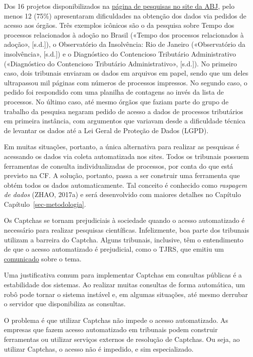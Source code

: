 \documentclass[12pt,twoside,brazilian]{book}
\begin{document}
Dos 16 projetos disponibilizados na
\href{https://abj.org.br/pesquisas/}{página de pesquisas no site da
ABJ}, pelo menos 12 (75\%) apresentaram dificuldades na obtenção dos
dados via pedidos de acesso aos órgãos. Três exemplos icônicos são o da
pesquisa sobre Tempo dos processos relacionados à adoção no Brasil
({«Tempo dos processos relacionados à adoção»}, {[}s.d.{]}), o
Observatório da Insolvência: Rio de Janeiro ({«Observatório da
insolvência»}, {[}s.d.{]}) e o Diagnóstico do Contencioso Tributário
Administrativo ({«Diagnóstico do Contencioso Tributário
Administrativo»}, {[}s.d.{]}). No primeiro caso, dois tribunais enviaram
os dados em arquivos em papel, sendo que um deles ultrapassou mil
páginas com números de processos impressos. No segundo caso, o pedido
foi respondido com uma planilha de contagens ao invés da lista de
processos. No último caso, até mesmo órgãos que faziam parte do grupo de
trabalho da pesquisa negaram pedido de acesso a dados de processos
tributários em primeira instância, com argumentos que variavam desde a
dificuldade técnica de levantar os dados até a Lei Geral de Proteção de
Dados (LGPD).

Em muitas situações, portanto, a única alternativa para realizar as
pesquisas é acessando os dados via coleta automatizada nos sites. Todos
os tribunais possuem ferramentas de consulta individualizadas de
processos, por conta do que está previsto na CF. A solução, portanto,
passa a ser construir uma ferramenta que obtém todos os dados
automaticamente. Tal conceito é conhecido como \emph{raspagem de dados}
(ZHAO, 2017a) e será desenvolvido com maiores detalhes no Capítulo
Capítulo~\ref{sec-metodologia}.

Os Captchas se tornam prejudiciais à sociedade quando o acesso
automatizado é necessário para realizar pesquisas científicas.
Infelizmente, boa parte dos tribunais utilizam a barreira do Captcha.
Alguns tribunais, inclusive, têm o entendimento de que o acesso
automatizado é prejudicial, como o TJRS, que emitiu um
\href{https://www.tjrs.jus.br/novo/processos-e-servicos/processo-eletronico/acesso-robotizado-a-dados-publicos-e-duplamente-arriscado/}{comunicado}
sobre o tema.

Uma justificativa comum para implementar Captchas em consultas públicas
é a estabilidade dos sistemas. Ao realizar muitas consultas de forma
automática, um robô pode tornar o sistema instável e, em algumas
situações, até mesmo derrubar o servidor que disponibiliza as consultas.

O problema é que utilizar Captchas não impede o acesso automatizado. As
empresas que fazem acesso automatizado em tribunais podem construir
ferramentas ou utilizar serviços externos de resolução de Captchas. Ou
seja, ao utilizar Captchas, o acesso não é impedido, e sim
especializado.
\end{document}
